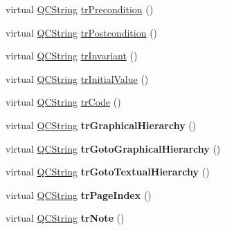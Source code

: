 \begin{DoxyCompactItemize}
\item 
virtual \mbox{\hyperlink{class_q_c_string}{Q\+C\+String}} \mbox{\hyperlink{class_translator_chinese_a6b249ec65f4342efdcbade8048e443f0}{tr\+Precondition}} ()
\item 
virtual \mbox{\hyperlink{class_q_c_string}{Q\+C\+String}} \mbox{\hyperlink{class_translator_chinese_a915d9d788979b90c58b8e46849b7c747}{tr\+Postcondition}} ()
\item 
virtual \mbox{\hyperlink{class_q_c_string}{Q\+C\+String}} \mbox{\hyperlink{class_translator_chinese_adce8fc7f636074b243f47c76f4e6b37b}{tr\+Invariant}} ()
\item 
virtual \mbox{\hyperlink{class_q_c_string}{Q\+C\+String}} \mbox{\hyperlink{class_translator_chinese_abc5eebbdbf49c5cbfce2fb8c99997b8a}{tr\+Initial\+Value}} ()
\item 
virtual \mbox{\hyperlink{class_q_c_string}{Q\+C\+String}} \mbox{\hyperlink{class_translator_chinese_aa8465ab632d130bec3c387ebea46a42a}{tr\+Code}} ()
\item 
\mbox{\label{class_translator_chinese_ae5216bcea6efdda2ad44c3950ec105b7}} 
virtual \mbox{\hyperlink{class_q_c_string}{Q\+C\+String}} {\bfseries tr\+Graphical\+Hierarchy} ()
\item 
\mbox{\label{class_translator_chinese_a79d5f496311a8c9a4c541a90417a0ee7}} 
virtual \mbox{\hyperlink{class_q_c_string}{Q\+C\+String}} {\bfseries tr\+Goto\+Graphical\+Hierarchy} ()
\item 
\mbox{\label{class_translator_chinese_a89dfa295046abf83283e6ef809bbfa3f}} 
virtual \mbox{\hyperlink{class_q_c_string}{Q\+C\+String}} {\bfseries tr\+Goto\+Textual\+Hierarchy} ()
\item 
\mbox{\label{class_translator_chinese_ad65d9cc8406a34039af49f535a93b515}} 
virtual \mbox{\hyperlink{class_q_c_string}{Q\+C\+String}} {\bfseries tr\+Page\+Index} ()
\item 
\mbox{\label{class_translator_chinese_a06202e86ce37bf85298eee63ab4586a6}} 
virtual \mbox{\hyperlink{class_q_c_string}{Q\+C\+String}} {\bfseries tr\+Note} ()
\item 
\mbox{\label{class_translator_chinese_a90098a9c778446374cd95811ed64e039}} 

\end{DoxyCompactItemize}
